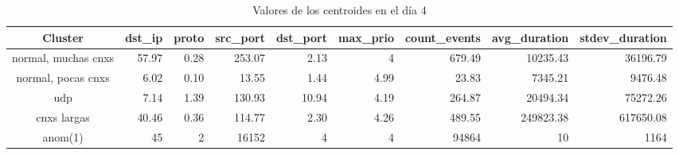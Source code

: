 \begin{table}[h]
    \begingroup
    \setlength{\tabcolsep}{2pt} %
    \renewcommand{\arraystretch}{2} %
    \hspace*{-3cm}
    \begin{tabular}{|c|r|r|r|r|r|r|r|r|}
    \hline
    \textbf{Cluster}    & \textbf{dst\_ip} & \textbf{proto} & \textbf{src\_port} & \textbf{dst\_port} & \textbf{max\_prio} & \textbf{count\_events} & \textbf{avg\_duration} & \textbf{stdev\_duration} \\ \hline
    normal, muchas cnxs & 57.97            & 0.28           & 253.07             & 2.13               & 4                  & 679.49                 & 10235.43               & 36196.79                 \\ \hline
    normal, pocas cnxs  & 6.02             & 0.10           & 13.55              & 1.44               & 4.99               & 23.83                  & 7345.21                & 9476.48                  \\ \hline
    udp                 & 7.14             & 1.39           & 130.93             & 10.94              & 4.19               & 264.87                 & 20494.34               & 75272.26                 \\ \hline
    cnxs largas         & 40.46            & 0.36           & 114.77             & 2.30               & 4.26               & 489.55                 & 249823.38              & 617650.08                \\ \hline
    anom(1)             & 45               & 2              & 16152              & 4                  & 4                  & 94864                  & 10                     & 1164                     \\ \hline
    \end{tabular}
    \endgroup
\bigskip
\caption{Valores de los centroides en el día 4}
\bigskip
\label{tab:dia4}
\end{table}

